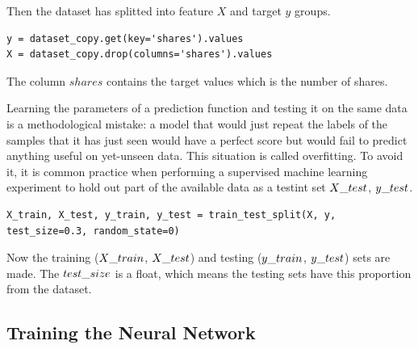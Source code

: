 \noindent Then the dataset has splitted into feature $X$ and target $y$ groups.
\begin{lstlisting}
y = dataset_copy.get(key='shares').values
X = dataset_copy.drop(columns='shares').values
\end{lstlisting}
The column $shares$ contains the target values which is the number of shares.\medskip

Learning the parameters of a prediction function and testing it on the same data is a methodological mistake: a model that would just repeat the labels of the samples that it has just seen would have a perfect score but would fail to predict anything useful on yet-unseen data. This situation is called overfitting. To avoid it, it is common practice when performing a supervised machine learning experiment to hold out part of the available data as a testint set $X\char`_test$, $y\char`_test$. 
\begin{lstlisting}
X_train, X_test, y_train, y_test = train_test_split(X, y, test_size=0.3, random_state=0)
\end{lstlisting}
Now the training ($X\char`_train$, $X\char`_test$) and testing ($y\char`_train$, $y\char`_test$) sets are made. The $test\char`_size$ is a float, which means the testing sets have this proportion from the dataset.



\subsection{Training the Neural Network}

